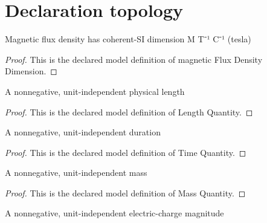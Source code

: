 \section{Declaration topology}
\begin{definition}
  \label{def:physics:phyx-mini-0957:phyxminiproblems-problemphyxmini0957-magneticfluxdensitydimension}
  Magnetic flux density has coherent-SI dimension M T⁻¹ C⁻¹ (tesla)
\end{definition}
\begin{proof}
  This is the declared model definition of magnetic Flux Density Dimension.
\end{proof}
\begin{definition}
  \label{def:physics:phyx-mini-0957:phyxminiproblems-problemphyxmini0957-lengthquantity}
  A nonnegative, unit-independent physical length
\end{definition}
\begin{proof}
  This is the declared model definition of Length Quantity.
\end{proof}
\begin{definition}
  \label{def:physics:phyx-mini-0957:phyxminiproblems-problemphyxmini0957-timequantity}
  A nonnegative, unit-independent duration
\end{definition}
\begin{proof}
  This is the declared model definition of Time Quantity.
\end{proof}
\begin{definition}
  \label{def:physics:phyx-mini-0957:phyxminiproblems-problemphyxmini0957-massquantity}
  A nonnegative, unit-independent mass
\end{definition}
\begin{proof}
  This is the declared model definition of Mass Quantity.
\end{proof}
\begin{definition}
  \label{def:physics:phyx-mini-0957:phyxminiproblems-problemphyxmini0957-chargemagnitudequantity}
  A nonnegative, unit-independent electric-charge magnitude
\end{definition}
